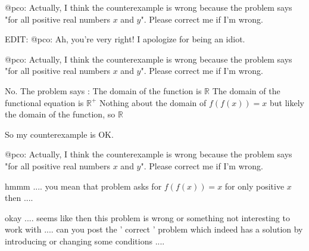 \begin{solution}
	@pco: Actually, I think the counterexample is wrong because the problem says "for all positive real numbers $x$ and $y$". Please correct me if I'm wrong.

EDIT: @pco: Ah, you're very right! I apologize for being an idiot.
\end{solution}



\begin{solution}
	\begin{tcolorbox}@pco: Actually, I think the counterexample is wrong because the problem says "for all positive real numbers $x$ and $y$". Please correct me if I'm wrong.\end{tcolorbox}
No.
The problem says :
The domain of the function is $\mathbb R$
The domain of the functional equation is $\mathbb R^+$
Nothing about the domain of $f(f(x))=x$ but likely the domain of the function, so $\mathbb R$

So my counterexample is OK.
\end{solution}



\begin{solution}
	\begin{tcolorbox}@pco: Actually, I think the counterexample is wrong because the problem says "for all positive real numbers $x$ and $y$". Please correct me if I'm wrong.\end{tcolorbox}

hmmm .... you mean that problem asks for $  f ( f ( x ) ) = x $ for only positive $ x $ then ....
\end{solution}



\begin{solution}
	okay .... seems like then this problem is wrong or something not interesting to work with .... can you post the ' correct ' problem which indeed has a solution by introducing or changing some conditions ....
\end{solution}



